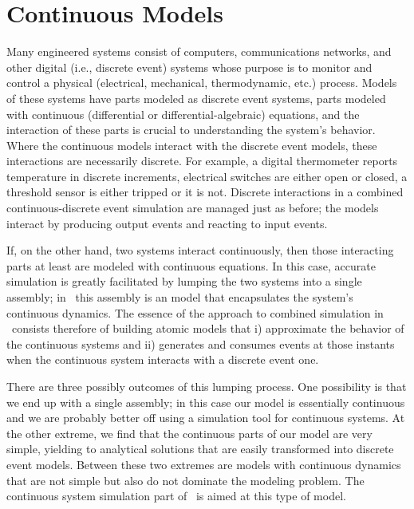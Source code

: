 \chapter{Continuous Models}
Many engineered systems consist of computers, communications networks, and other digital (i.e., discrete event) systems whose purpose is to monitor and control a physical (electrical, mechanical, thermodynamic, etc.) process. Models of these systems have parts modeled as discrete event systems, parts modeled with continuous (differential or differential-algebraic) equations, and the interaction of these parts is crucial to understanding the system's behavior. Where the continuous models interact with the discrete event models, these interactions are necessarily discrete. For example, a digital thermometer reports temperature in discrete increments, electrical switches are either open or closed, a threshold sensor is either tripped or it is not. Discrete interactions in a combined continuous-discrete event simulation are managed just as before; the models interact by producing output events and reacting to input events.

If, on the other hand, two systems interact continuously, then those interacting parts at least are modeled with continuous equations. In this case, accurate simulation is greatly facilitated by lumping the two systems into a single assembly; in \adevs\ this assembly is an  model that encapsulates the system's continuous dynamics. The essence of the approach to combined simulation in \adevs\ consists therefore of building atomic models that i) approximate the behavior of the continuous systems and ii) generates and consumes events at those instants when the continuous system interacts with a discrete event one.

There are three possibly outcomes of this lumping process. One possibility is that we end up with a single assembly; in this case our model is essentially continuous and we are probably better off using a simulation tool for continuous systems. At the other extreme, we find that the continuous parts of our model are very simple, yielding to analytical solutions that are easily transformed into discrete event models. Between these two extremes are models with continuous dynamics that are not simple but also do not dominate the modeling problem. The continuous system simulation part of \adevs\ is aimed at this type of model.

